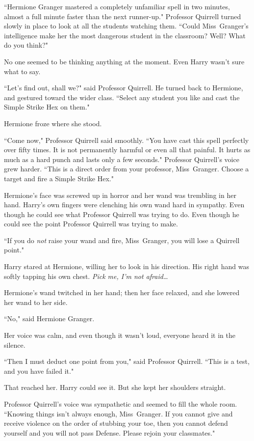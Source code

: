 ``Hermione Granger mastered a completely unfamiliar spell in two minutes, almost a full minute faster than the next runner-up." Professor Quirrell turned slowly in place to look at all the students watching them. ``Could Miss~Granger's intelligence make her the most dangerous student in the classroom? Well? What do you think?"

No one seemed to be thinking anything at the moment. Even Harry wasn't sure what to say.

``Let's find out, shall we?" said Professor Quirrell. He turned back to Hermione, and gestured toward the wider class. ``Select any student you like and cast the Simple Strike Hex on them."

Hermione froze where she stood.

``Come now," Professor Quirrell said smoothly. ``You have cast this spell perfectly over fifty times. It is not permanently harmful or even all that painful. It hurts as much as a hard punch and lasts only a few seconds." Professor Quirrell's voice grew harder. ``This is a direct order from your professor, Miss~Granger. Choose a target and fire a Simple Strike Hex."

Hermione's face was screwed up in horror and her wand was trembling in her hand. Harry's own fingers were clenching his own wand hard in sympathy. Even though he could see what Professor Quirrell was trying to do. Even though he could see the point Professor Quirrell was trying to make.

``If you do \emph{not} raise your wand and fire, Miss~Granger, you will lose a Quirrell point."

Harry stared at Hermione, willing her to look in his direction. His right hand was softly tapping his own chest. \emph{Pick me, I'm not afraid{\ldots}}

Hermione's wand twitched in her hand; then her face relaxed, and she lowered her wand to her side.

``No," said Hermione Granger.

Her voice was calm, and even though it wasn't loud, everyone heard it in the silence.

``Then I must deduct one point from you," said Professor Quirrell. ``This is a test, and you have failed it."

That reached her. Harry could see it. But she kept her shoulders straight.

Professor Quirrell's voice was sympathetic and seemed to fill the whole room. ``Knowing things isn't always enough, Miss~Granger. If you cannot give and receive violence on the order of stubbing your toe, then you cannot defend yourself and you will not pass Defense. Please rejoin your classmates."

